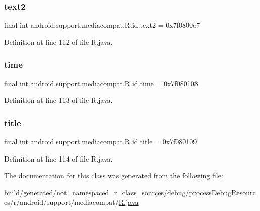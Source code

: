 \mbox{\label{classandroid_1_1support_1_1mediacompat_1_1_r_1_1id_af89db6d57c69dfd896242a53693866c9}} 
\subsubsection{\texorpdfstring{text2}{text2}}
{\footnotesize\ttfamily final int android.\+support.\+mediacompat.\+R.\+id.\+text2 = 0x7f0800e7\hspace{0.3cm}{\ttfamily [static]}}



Definition at line 112 of file R.\+java.

\mbox{\label{classandroid_1_1support_1_1mediacompat_1_1_r_1_1id_af3ae580d9965637cb4e92633f0d964ee}} 
\subsubsection{\texorpdfstring{time}{time}}
{\footnotesize\ttfamily final int android.\+support.\+mediacompat.\+R.\+id.\+time = 0x7f080108\hspace{0.3cm}{\ttfamily [static]}}



Definition at line 113 of file R.\+java.

\mbox{\label{classandroid_1_1support_1_1mediacompat_1_1_r_1_1id_a6040b8dfeb6da7cd9778754e38ed9bb3}} 
\subsubsection{\texorpdfstring{title}{title}}
{\footnotesize\ttfamily final int android.\+support.\+mediacompat.\+R.\+id.\+title = 0x7f080109\hspace{0.3cm}{\ttfamily [static]}}



Definition at line 114 of file R.\+java.



The documentation for this class was generated from the following file\+:\begin{DoxyCompactItemize}
\item 
build/generated/not\+\_\+namespaced\+\_\+r\+\_\+class\+\_\+sources/debug/process\+Debug\+Resources/r/android/support/mediacompat/\mbox{\hyperlink{android_2support_2mediacompat_2_r_8java}{R.\+java}}\end{DoxyCompactItemize}
